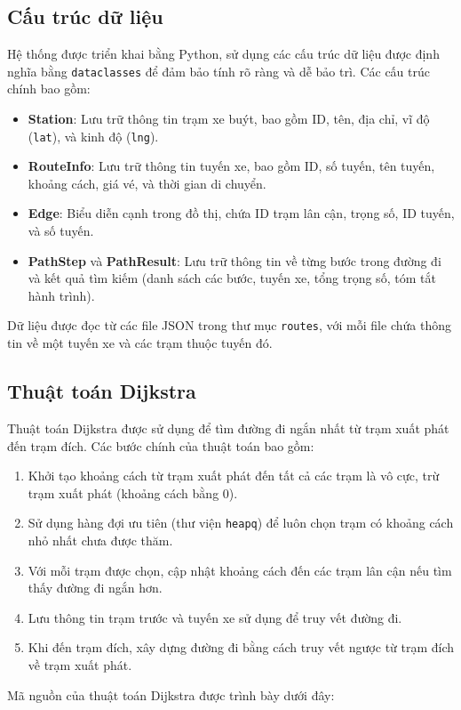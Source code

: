 \documentclass[a4paper,12pt]{article}
\begin{document}
\subsection{Cấu trúc dữ liệu}
Hệ thống được triển khai bằng Python, sử dụng các cấu trúc dữ liệu được định nghĩa bằng \texttt{dataclasses} để đảm bảo tính rõ ràng và dễ bảo trì. Các cấu trúc chính bao gồm:
\begin{itemize}
    \item \textbf{Station}: Lưu trữ thông tin trạm xe buýt, bao gồm ID, tên, địa chỉ, vĩ độ (\texttt{lat}), và kinh độ (\texttt{lng}).
    \item \textbf{RouteInfo}: Lưu trữ thông tin tuyến xe, bao gồm ID, số tuyến, tên tuyến, khoảng cách, giá vé, và thời gian di chuyển.
    \item \textbf{Edge}: Biểu diễn cạnh trong đồ thị, chứa ID trạm lân cận, trọng số, ID tuyến, và số tuyến.
    \item \textbf{PathStep} và \textbf{PathResult}: Lưu trữ thông tin về từng bước trong đường đi và kết quả tìm kiếm (danh sách các bước, tuyến xe, tổng trọng số, tóm tắt hành trình).
\end{itemize}
Dữ liệu được đọc từ các file JSON trong thư mục \texttt{routes}, với mỗi file chứa thông tin về một tuyến xe và các trạm thuộc tuyến đó.

\subsection{Thuật toán Dijkstra}
Thuật toán Dijkstra được sử dụng để tìm đường đi ngắn nhất từ trạm xuất phát đến trạm đích. Các bước chính của thuật toán bao gồm:
\begin{enumerate}
    \item Khởi tạo khoảng cách từ trạm xuất phát đến tất cả các trạm là vô cực, trừ trạm xuất phát (khoảng cách bằng 0).
    \item Sử dụng hàng đợi ưu tiên (thư viện \texttt{heapq}) để luôn chọn trạm có khoảng cách nhỏ nhất chưa được thăm.
    \item Với mỗi trạm được chọn, cập nhật khoảng cách đến các trạm lân cận nếu tìm thấy đường đi ngắn hơn.
    \item Lưu thông tin trạm trước và tuyến xe sử dụng để truy vết đường đi.
    \item Khi đến trạm đích, xây dựng đường đi bằng cách truy vết ngược từ trạm đích về trạm xuất phát.
\end{enumerate}
Mã nguồn của thuật toán Dijkstra được trình bày dưới đây:
\end{document}
